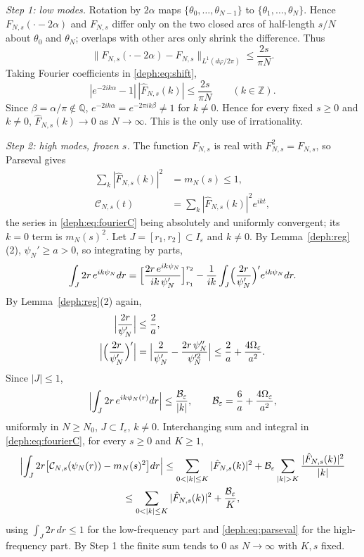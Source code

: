 \emph{Step 1: low modes.} Rotation by $2\alpha$ maps $\{\theta_0,\dots,\theta_{N-1}\}$ to $\{\theta_1,\dots,\theta_N\}$. Hence
$F_{N,s}(\cdot-2\alpha)$ and $F_{N,s}$ differ only on the two closed arcs of half-length $s/N$ about $\theta_0$ and $\theta_N$; overlaps
with other arcs only shrink the difference. Thus
\begin{equation}\label{deph:eq:shift}
\|F_{N,s}(\cdot-2\alpha)-F_{N,s}\|_{L^1(d\varphi/2\pi)}\le\frac{2s}{\pi N}.
\end{equation}
Taking Fourier coefficients in \eqref{deph:eq:shift},
\[
|e^{-2ik\alpha}-1|\,|\hat F_{N,s}(k)|\le\frac{2s}{\pi N}\qquad(k\in\mathbb Z).
\]
Since $\beta=\alpha/\pi\notin\mathbb Q$, $e^{-2ik\alpha}=e^{-2\pi ik\beta}\ne1$ for $k\ne0$. Hence for every fixed $s\ge0$ and $k\ne0$,
$\hat F_{N,s}(k)\to0$ as $N\to\infty$. This is the only use of irrationality.

\emph{Step 2: high modes, frozen $s$.} The function $F_{N,s}$ is real with $F_{N,s}^2=F_{N,s}$, so Parseval gives
\begin{align}
\sum_k|\hat F_{N,s}(k)|^2&=m_N(s)\le1, \label{deph:eq:parseval}\\
\mathcal C_{N,s}(t)&=\sum_k|\hat F_{N,s}(k)|^2e^{ikt}, \label{deph:eq:fourierC}
\end{align}
the series in \eqref{deph:eq:fourierC} being absolutely and uniformly convergent; its $k=0$ term is $m_N(s)^2$.
Let $J=[r_1,r_2]\subset I_\varepsilon$ and $k\ne0$. By Lemma~\ref{deph:reg}(2), $\psi_N'\ge a>0$, so integrating by parts,
\[
\int_J2r\,e^{ik\psi_N}dr=\Bigl[\frac{2r\,e^{ik\psi_N}}{ik\,\psi_N'}\Bigr]_{r_1}^{r_2}-\frac1{ik}\int_J\Bigl(\frac{2r}{\psi_N'}\Bigr)'e^{ik\psi_N}dr .
\]
By Lemma~\ref{deph:reg}(2) again,
\begin{align*}
\Bigl|\frac{2r}{\psi_N'}\Bigr|&\le\frac2a,\\
\Bigl|\Bigl(\frac{2r}{\psi_N'}\Bigr)'\Bigr|&=\Bigl|\frac2{\psi_N'}-\frac{2r\,\psi_N''}{\psi_N'^2}\Bigr|\le\frac2a+\frac{4\Omega_\varepsilon}{a^2}.
\end{align*}
Since $|J|\le1$,
\begin{equation}\label{deph:ibp}
\Bigl|\int_J2r\,e^{ik\psi_N(r)}dr\Bigr|\le\frac{\mathcal B_\varepsilon}{|k|},\qquad \mathcal B_\varepsilon=\frac6a+\frac{4\Omega_\varepsilon}{a^2},
\end{equation}
uniformly in $N\ge N_0$, $J\subset I_\varepsilon$, $k\ne0$. Interchanging sum and integral in \eqref{deph:eq:fourierC}, for every $s\ge0$ and $K\ge1$,
\begin{multline}\label{deph:frozen}
\Bigl|\int_J2r\bigl[\mathcal C_{N,s}(\psi_N(r))-m_N(s)^2\bigr]dr\Bigr|\le\sum_{0<|k|\le K}|\hat F_{N,s}(k)|^2+\mathcal B_\varepsilon\sum_{|k|>K}\frac{|\hat F_{N,s}(k)|^2}{|k|}\\
\le\sum_{0<|k|\le K}|\hat F_{N,s}(k)|^2+\frac{\mathcal B_\varepsilon}K,
\end{multline}
using $\int_J2r\,dr\le1$ for the low-frequency part and \eqref{deph:eq:parseval} for the high-frequency part. By Step 1 the finite sum tends to $0$ as $N\to\infty$ with $K,s$ fixed.

